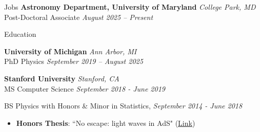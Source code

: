 \documentclass{resume} %
\begin{document}
\begin{rSection}{Jobs}
{\bf Astronomy Department, University of Maryland} \hfill {\em College Park, MD} 
\\ Post-Doctoral Associate \hfill {\em August 2025 -- Present}
\end{rSection}

\begin{rSection}{Education}

{\bf University of Michigan} \hfill {\em Ann Arbor, MI} 
\\ PhD Physics \hfill {\em September 2019 -- August 2025}
\vspace*{-0.1cm}
%

{\bf Stanford University} \hfill {\em Stanford, CA} 
\\ MS Computer Science \hfill {\em September 2018 - June 2019}
\vspace*{-0.1cm}
%


%
BS Physics with Honors \& Minor in Statistics, \hfill {\em September 2014 - June 2018}
%
\vspace*{-0.1cm}
\begin{itemize}[itemsep=-0.25em] 

    \item 
    \textbf{Honors Thesis}: ``No escape: light waves in AdS" (\href{https://purl.stanford.edu/vf208qp2190}{Link})

\end{itemize}
%
\vspace*{-0.1cm}
\end{rSection}

\end{document}
